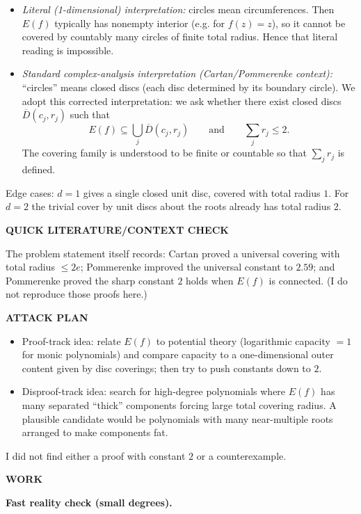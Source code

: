 \begin{itemize}
\item \emph{Literal (1-dimensional) interpretation:} circles mean circumferences. Then $E(f)$ typically has nonempty interior (e.g. for $f(z)=z$), so it cannot be covered by countably many circles of finite total radius. Hence that literal reading is impossible.
\item \emph{Standard complex-analysis interpretation (Cartan/Pommerenke context):} ``circles'' means closed discs (each disc determined by its boundary circle). We adopt this corrected interpretation: we ask whether there exist closed discs $\overline{D}(c_j,r_j)$ such that
\[
E(f)\subseteq \bigcup_j \overline{D}(c_j,r_j)
\qquad\text{and}\qquad \sum_j r_j\le 2.
\]
The covering family is understood to be finite or countable so that $\sum_j r_j$ is defined.
\end{itemize}

Edge cases: $d=1$ gives a single closed unit disc, covered with total radius $1$. For $d=2$ the trivial cover by unit discs about the roots already has total radius $2$.

\medskip
\noindent\textbf{QUICK LITERATURE/CONTEXT CHECK}

The problem statement itself records: Cartan proved a universal covering with total radius $\le 2e$; Pommerenke improved the universal constant to $2.59$; and Pommerenke proved the sharp constant $2$ holds when $E(f)$ is connected. (I do not reproduce those proofs here.)

\medskip
\noindent\textbf{ATTACK PLAN}

\begin{itemize}
\item Proof-track idea: relate $E(f)$ to potential theory (logarithmic capacity $=1$ for monic polynomials) and compare capacity to a one-dimensional outer content given by disc coverings; then try to push constants down to $2$.
\item Disproof-track idea: search for high-degree polynomials where $E(f)$ has many separated ``thick'' components forcing large total covering radius. A plausible candidate would be polynomials with many near-multiple roots arranged to make components fat.
\end{itemize}
I did not find either a proof with constant $2$ or a counterexample.

\medskip
\noindent\textbf{WORK}

\noindent\textbf{Fast reality check (small degrees).}

